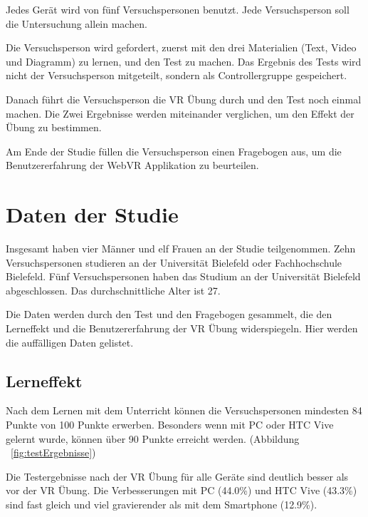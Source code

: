 Jedes Gerät wird von fünf Versuchspersonen benutzt. Jede Versuchsperson soll die Untersuchung allein machen.

Die Versuchsperson wird gefordert, zuerst mit den drei Materialien (Text, Video und Diagramm) zu lernen, und den Test zu machen. Das Ergebnis des Tests wird nicht der Versuchsperson mitgeteilt, sondern als Controllergruppe gespeichert.

Danach führt die Versuchsperson die VR Übung durch und den Test noch einmal machen. Die Zwei Ergebnisse werden miteinander verglichen, um den Effekt der Übung zu bestimmen.

Am Ende der Studie füllen die Versuchsperson einen Fragebogen aus, um die Benutzererfahrung der WebVR Applikation zu beurteilen.

\section{Daten der Studie}

Insgesamt haben vier Männer und elf Frauen an der Studie teilgenommen. Zehn Versuchspersonen studieren an der Universität Bielefeld oder Fachhochschule Bielefeld. Fünf Versuchspersonen haben das Studium an der Universität Bielefeld abgeschlossen. Das durchschnittliche Alter ist 27.

Die Daten werden durch den Test und den Fragebogen gesammelt, die den Lerneffekt und die Benutzererfahrung der VR Übung widerspiegeln. Hier werden die auffälligen Daten gelistet.

\subsection{Lerneffekt}

Nach dem Lernen mit dem Unterricht können die Versuchspersonen mindesten 84 Punkte von 100 Punkte erwerben. Besonders wenn mit PC oder HTC Vive gelernt wurde, können über 90 Punkte erreicht werden. (Abbildung ~\ref{fig:testErgebnisse})

Die Testergebnisse nach der VR Übung für alle Geräte sind deutlich besser als vor der VR Übung. Die Verbesserungen mit PC (44.0\%) und HTC Vive (43.3\%) sind fast gleich und viel gravierender als mit dem Smartphone (12.9\%).

